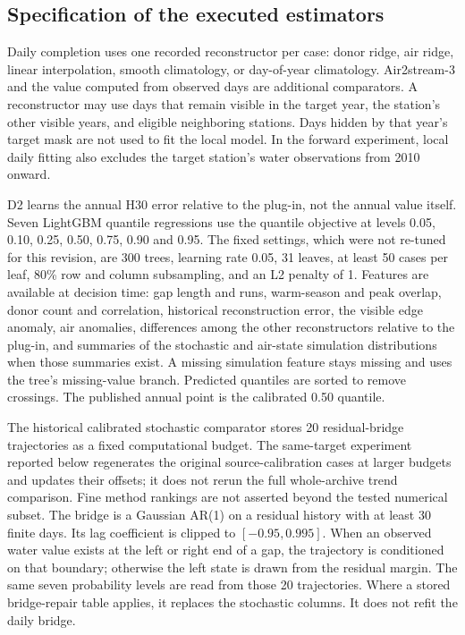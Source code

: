 \subsection{Specification of the executed estimators}
Daily completion uses one recorded reconstructor per case: donor ridge, air ridge, linear interpolation, smooth climatology, or day-of-year climatology. Air2stream-3 and the value computed from observed days are additional comparators. A reconstructor may use days that remain visible in the target year, the station's other visible years, and eligible neighboring stations. Days hidden by that year's target mask are not used to fit the local model. In the forward experiment, local daily fitting also excludes the target station's water observations from 2010 onward.

D2 learns the annual H30 error relative to the plug-in, not the annual value itself. Seven LightGBM quantile regressions use the quantile objective at levels 0.05, 0.10, 0.25, 0.50, 0.75, 0.90 and 0.95. The fixed settings, which were not re-tuned for this revision, are 300 trees, learning rate 0.05, 31 leaves, at least 50 cases per leaf, 80\% row and column subsampling, and an L2 penalty of 1. Features are available at decision time: gap length and runs, warm-season and peak overlap, donor count and correlation, historical reconstruction error, the visible edge anomaly, air anomalies, differences among the other reconstructors relative to the plug-in, and summaries of the stochastic and air-state simulation distributions when those summaries exist. A missing simulation feature stays missing and uses the tree's missing-value branch. Predicted quantiles are sorted to remove crossings. The published annual point is the calibrated 0.50 quantile.

The historical calibrated stochastic comparator stores 20 residual-bridge trajectories as a fixed computational budget. The same-target experiment reported below regenerates the original source-calibration cases at larger budgets and updates their offsets; it does not rerun the full whole-archive trend comparison. Fine method rankings are not asserted beyond the tested numerical subset. The bridge is a Gaussian AR(1) on a residual history with at least 30 finite days. Its lag coefficient is clipped to $[-0.95,0.995]$. When an observed water value exists at the left or right end of a gap, the trajectory is conditioned on that boundary; otherwise the left state is drawn from the residual margin. The same seven probability levels are read from those 20 trajectories. Where a stored bridge-repair table applies, it replaces the stochastic columns. It does not refit the daily bridge.

